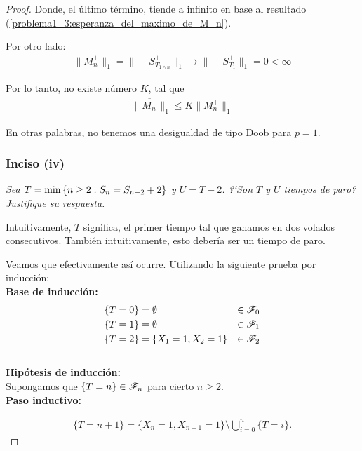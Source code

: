 \begin{proof}
		Donde, el último término, tiende a infinito en base al resultado 
		(\ref{problema1_3:esperanza_del_maximo_de_M_n}).

		Por otro lado:
		\begin{align}
			\|M_n^+\|_1=\|-S_{T_{1\wedge n}}^{+}\|_1  \longrightarrow  \|-S_{T_1}^+\|_1 = 0 < \infty
		\end{align}
		
		Por lo tanto, no existe número $K$, tal que
		\begin{align}
			 \|\overline{M_n^+}\|_1 \leq  K \|M_n^+\|_1
		\end{align}
		
		En otras palabras, no tenemos una desigualdad de tipo Doob para $p=1$.\\
		
	\subsubsection{Inciso (iv)}
	\emph
	{
		Sea $T=\min\left\{ n\geq 2:S_n=S_{n-2} + 2\right\} $ y $U=T-2$. ?`Son $T$ y $U$ 
		tiempos de paro? Justifique su respuesta.\\
	}
	
		Intuitivamente, $T$ significa, el primer tiempo tal que ganamos en dos volados consecutivos.
		También intuitivamente, esto debería ser un tiempo de paro.
		
		Veamos que efectivamente así ocurre. Utilizando la siguiente prueba por inducción:\\
		
		\textbf{Base de inducción:}		
			\begin{align}
				\{T = 0\} 		&= \emptyset  				& 	\in \mathscr{F}_0 \\
				\{T = 1\} 		&= \emptyset  				& 	\in \mathscr{F}_1 \\
				\{T = 2\} 		&= \{ X_1 = 1, X_2 = 1\} 	&	\in \mathscr{F}_2
			\end{align}	\\					
		
		\textbf{Hipótesis de inducción:}\\
		
			Supongamos que $\{T = n\} \in \mathscr{F}_n$ para cierto $n \geq 2$.\\
			
		\textbf{Paso inductivo:}
			
			\begin{align}
				\{T = n + 1 \} = \{ X_n = 1, X_{n+1} = 1\} \setminus \bigcup_{i=0}^{n} \{T = i\}.
			\end{align}				
		

\end{proof}
